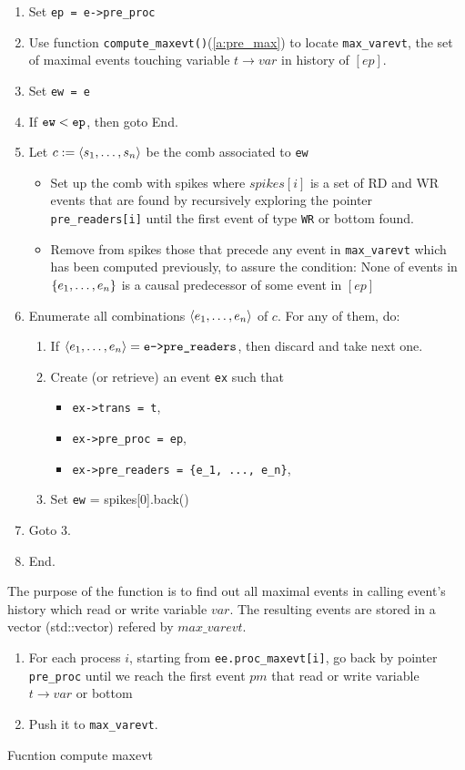 \documentclass{llncs}
\begin{document}
\begin{enumerate}
\item Set \verb!ep = e->pre_proc!
\item
	Use function \verb!compute_maxevt()!(\cref{a:pre_max}) to locate \verb!max_varevt!, the set of maximal events touching variable $t \rightarrow var$ in history of $[ep]$. 
\item Set \verb!ew = e!
\item If $\verb!ew! < \verb!ep!$, then goto End.
\item Let $c \mathrel{:=} \langle s_1, \ldots, s_n\rangle$ be the comb associated to \verb!ew!
	\begin{itemize}
	\item
		Set up the comb with spikes where $spikes[i]$ is a set of RD and WR events that are found by recursively exploring the
		pointer \verb!pre_readers[i]! until the first event of type \verb!WR! or bottom found.
	\item
		Remove from spikes those that precede any event in \verb!max_varevt! which has been computed previously, to assure the condition: None of events in ${\{ e_1, \ldots, e_n \mathclose \}} $ is a causal predecessor of some event in $[ep]$
\end{itemize}
\item
  Enumerate all combinations $\langle e_1, \ldots, e_n\rangle$ of $c$.
  For any of them, do:
  \begin{enumerate}
  \item
    If $\tup{e_1, \ldots, e_n} = \verb!e->pre_readers!$, then discard and take
    next one.
  \item
    Create (or retrieve) an event \verb!ex! such that
    \begin{itemize}
    \item \verb!ex->trans = t!,
    \item \verb!ex->pre_proc = ep!,
    \item \verb!ex->pre_readers = {e_1, ..., e_n}!,
    \end{itemize}
  \item
    Set \verb!ew! = spikes[0].back() 
  \end{enumerate}
\item Goto 3.
\item End.
\end{enumerate}

\begin{algorithm}
\label{a:pre_max}
The purpose of the function is to find out all maximal events in calling event's history which read or write variable $var$. The resulting events are stored in a vector (std::vector) refered by $max\_varevt$.  
\begin{enumerate}
\item
	For each process $i$, starting from \verb!ee.proc_maxevt[i]!, go back by pointer \verb!pre_proc! until we reach the first
	event $pm$ that read or write variable $t \rightarrow var$ or bottom	
\item
	Push it to \verb!max_varevt!.
\end{enumerate}
\caption{Fucntion compute maxevt}
\end{algorithm}
\end{document}

